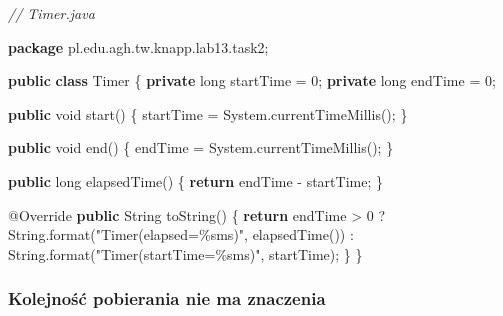 \documentclass[11pt]{article}
\newenvironment{Shaded}{}{}
\newcommand{\KeywordTok}[1]{\textcolor[rgb]{0.00,0.44,0.13}{\textbf{{#1}}}}
\newcommand{\DataTypeTok}[1]{\textcolor[rgb]{0.56,0.13,0.00}{{#1}}}
\newcommand{\DecValTok}[1]{\textcolor[rgb]{0.25,0.63,0.44}{{#1}}}
\newcommand{\StringTok}[1]{\textcolor[rgb]{0.25,0.44,0.63}{{#1}}}
\newcommand{\CommentTok}[1]{\textcolor[rgb]{0.38,0.63,0.69}{\textit{{#1}}}}
\newcommand{\FunctionTok}[1]{\textcolor[rgb]{0.02,0.16,0.49}{{#1}}}
\newcommand{\NormalTok}[1]{{#1}}
\newcommand{\SpecialCharTok}[1]{\textcolor[rgb]{0.25,0.44,0.63}{{#1}}}
\newcommand{\ImportTok}[1]{{#1}}
\newcommand{\ControlFlowTok}[1]{\textcolor[rgb]{0.00,0.44,0.13}{\textbf{{#1}}}}
\newcommand{\OperatorTok}[1]{\textcolor[rgb]{0.40,0.40,0.40}{{#1}}}
\newcommand{\BuiltInTok}[1]{{#1}}
\newcommand{\AttributeTok}[1]{\textcolor[rgb]{0.49,0.56,0.16}{{#1}}}
\begin{document}
    \begin{Shaded}
\begin{Highlighting}[]
\CommentTok{// Timer.java}

\KeywordTok{package}\ImportTok{ pl}\OperatorTok{.}\ImportTok{edu}\OperatorTok{.}\ImportTok{agh}\OperatorTok{.}\ImportTok{tw}\OperatorTok{.}\ImportTok{knapp}\OperatorTok{.}\ImportTok{lab13}\OperatorTok{.}\ImportTok{task2}\OperatorTok{;}

\KeywordTok{public} \KeywordTok{class} \BuiltInTok{Timer} \OperatorTok{\{}
    \KeywordTok{private} \DataTypeTok{long}\NormalTok{ startTime }\OperatorTok{=} \DecValTok{0}\OperatorTok{;}
    \KeywordTok{private} \DataTypeTok{long}\NormalTok{ endTime }\OperatorTok{=} \DecValTok{0}\OperatorTok{;}

    \KeywordTok{public} \DataTypeTok{void} \FunctionTok{start}\OperatorTok{()} \OperatorTok{\{}
\NormalTok{        startTime }\OperatorTok{=} \BuiltInTok{System}\OperatorTok{.}\FunctionTok{currentTimeMillis}\OperatorTok{();}
    \OperatorTok{\}}

    \KeywordTok{public} \DataTypeTok{void} \FunctionTok{end}\OperatorTok{()} \OperatorTok{\{}
\NormalTok{        endTime }\OperatorTok{=} \BuiltInTok{System}\OperatorTok{.}\FunctionTok{currentTimeMillis}\OperatorTok{();}
    \OperatorTok{\}}

    \KeywordTok{public} \DataTypeTok{long} \FunctionTok{elapsedTime}\OperatorTok{()} \OperatorTok{\{}
        \ControlFlowTok{return}\NormalTok{ endTime }\OperatorTok{{-}}\NormalTok{ startTime}\OperatorTok{;}
    \OperatorTok{\}}

    \AttributeTok{@Override}
    \KeywordTok{public} \BuiltInTok{String} \FunctionTok{toString}\OperatorTok{()} \OperatorTok{\{}
        \ControlFlowTok{return}\NormalTok{ endTime }\OperatorTok{\textgreater{}} \DecValTok{0} \OperatorTok{?}
                \BuiltInTok{String}\OperatorTok{.}\FunctionTok{format}\OperatorTok{(}\StringTok{"Timer(elapsed=}\SpecialCharTok{\%s}\StringTok{ms)"}\OperatorTok{,} \FunctionTok{elapsedTime}\OperatorTok{())} \OperatorTok{:}
                \BuiltInTok{String}\OperatorTok{.}\FunctionTok{format}\OperatorTok{(}\StringTok{"Timer(startTime=}\SpecialCharTok{\%s}\StringTok{ms)"}\OperatorTok{,}\NormalTok{ startTime}\OperatorTok{);}
    \OperatorTok{\}}
\OperatorTok{\}}
\end{Highlighting}
\end{Shaded}

    \hypertarget{kolejnoux15bux107-pobierania-nie-ma-znaczenia}{%
\subsubsection{Kolejność pobierania nie ma
znaczenia}\label{kolejnoux15bux107-pobierania-nie-ma-znaczenia}}
\end{document}

